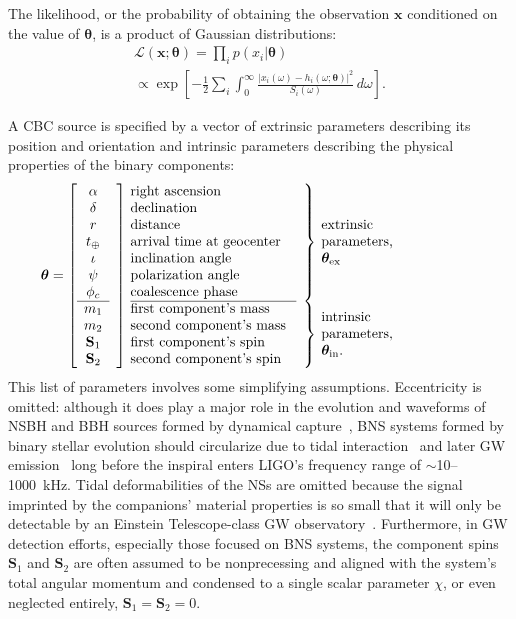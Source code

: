 \documentclass[amsmath,amssymb,aps,prx,reprint,nopreprintnumbers,nofootinbib]{revtex4-1}
\begin{document}
The likelihood, or the probability of obtaining the observation $\mathbf x$ conditioned on the value of $\bm\theta$, is a product of Gaussian distributions:
%
\begin{multline}\label{eq:gaussian-likelihood}
    \mathcal{L}(\mathbf x; \bm\theta) = \prod_i p(x_i | \bm\theta)
        \\ \propto \exp \left[
        - \frac{1}{2} \sum_i \int_0^\infty \frac{\left|x_i (\omega)
            - h_i(\omega; \bm\theta) \right|^2}{S_i(\omega)} \, d\omega
    \right].
\end{multline}

A \ac{CBC} source is specified by a vector of extrinsic parameters describing its position and orientation and intrinsic parameters describing the physical properties of the binary components:
%
\begin{equation}
    \bm\theta = \left[
    \begin{array}{cl@{\quad}p{4cm}lp{3.75cm}}
        \alpha & \rdelim]{11}{0mm} & right ascension & \rdelim\}{7}{1mm} & \multirow{7}{2cm}{extrinsic parameters, $\bm\theta_\mathrm{ex}$} \\
        \delta && declination & \\
        r && distance & \\
        t_\oplus && arrival time at geocenter & \\
        \iota && inclination angle & \\
        \psi && polarization angle & \\
        \phi_c && coalescence phase & \\
        \cline{1-1}\cline{3-3}
        m_1 && first component's mass & \rdelim\}{4}{1mm} & \multirow{4}{2cm}{intrinsic parameters, $\bm\theta_\mathrm{in}$.}\\
        m_2 && second component's mass & \\
        \mathbf S_1 && first component's spin & \\
        \mathbf S_2 && second component's spin & \\
    \end{array}\right.
\end{equation}
%
This list of parameters involves some simplifying assumptions. Eccentricity is omitted: although it does play a major role in the evolution and waveforms of \ac{NSBH} and \ac{BBH} sources formed by dynamical capture~\cite{PhysRevD.87.043004}, \ac{BNS} systems formed by binary stellar evolution should circularize due to tidal interaction~\cite{0004-637X-572-1-407} and later \ac{GW} emission~\cite{PhysRev.136.B1224} long before the inspiral enters \ac{LIGO}'s frequency range of $\sim$10\nobreakdashes--1000~kHz. Tidal deformabilities of the \acp{NS} are omitted because the signal imprinted by the companions' material properties is so small that it will only be detectable by an Einstein Telescope\nobreakdashes-class \ac{GW} observatory~\cite{PhysRevD.81.123016}. Furthermore, in \ac{GW} detection efforts, especially those focused on \ac{BNS} systems, the component spins $\mathbf{S}_1$ and $\mathbf{S}_2$ are often assumed to be nonprecessing and aligned with the system's total angular momentum and condensed to a single scalar parameter $\chi$, or even neglected entirely, $\mathbf{S}_1 = \mathbf{S}_2 = 0$.
\end{document}
